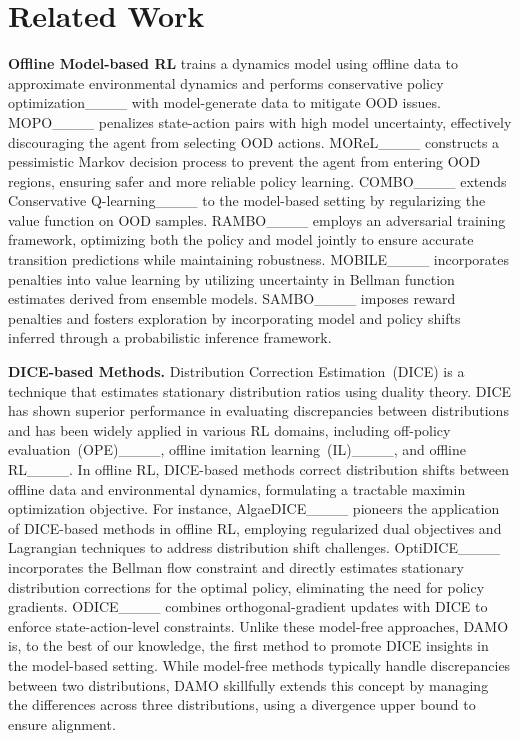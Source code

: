 \section{Related Work}
\textbf{Offline Model-based RL} trains a dynamics model using offline data to approximate environmental dynamics and performs conservative policy optimization____ with model-generate data to mitigate OOD issues. 
    MOPO____ penalizes state-action pairs with high model uncertainty, effectively discouraging the agent from selecting OOD actions. 
    MOReL____ constructs a pessimistic Markov decision process to prevent the agent from entering OOD regions, ensuring safer and more reliable policy learning. 
    COMBO____ extends Conservative Q-learning____ to the model-based setting by regularizing the value function on OOD samples.
    RAMBO____ employs an adversarial training framework, optimizing both the policy and model jointly to ensure accurate transition predictions while maintaining robustness. 
    MOBILE____ incorporates penalties into value learning by utilizing uncertainty in Bellman function estimates derived from ensemble models.
    SAMBO____ imposes reward penalties and fosters exploration by incorporating model and policy shifts inferred through a probabilistic inference framework.

    \textbf{DICE-based Methods.} Distribution Correction Estimation~(DICE) is a technique that estimates stationary distribution ratios using duality theory.
    DICE has shown superior performance in evaluating discrepancies between distributions and has been widely applied in various RL domains, including off-policy evaluation~(OPE)____, offline imitation learning~(IL)____, and offline RL____. 
    In offline RL, DICE-based methods correct distribution shifts between offline data and environmental dynamics, formulating a tractable maximin optimization objective. 
    For instance, AlgaeDICE____ pioneers the application of DICE-based methods in offline RL, employing regularized dual objectives and Lagrangian techniques to address distribution shift challenges. 
    OptiDICE____ incorporates the Bellman flow constraint and directly estimates stationary distribution corrections for the optimal policy, eliminating the need for policy gradients. 
    ODICE____ combines orthogonal-gradient updates with DICE to enforce state-action-level constraints. 
    Unlike these model-free approaches, DAMO is, to the best of our knowledge, the first method to promote DICE insights in the model-based setting. 
    While model-free methods typically handle discrepancies between two distributions, DAMO skillfully extends this concept by managing the differences across three distributions, using a divergence upper bound to ensure alignment.

